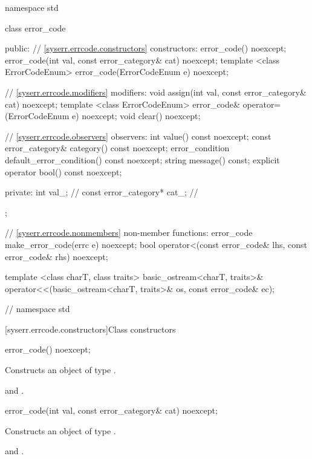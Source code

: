 %
\begin{codeblock}
namespace std {
  class error_code {
  public:
    // \ref{syserr.errcode.constructors} constructors:
    error_code() noexcept;
    error_code(int val, const error_category& cat) noexcept;
    template <class ErrorCodeEnum>
      error_code(ErrorCodeEnum e) noexcept;

    // \ref{syserr.errcode.modifiers} modifiers:
    void assign(int val, const error_category& cat) noexcept;
    template <class ErrorCodeEnum>
        error_code& operator=(ErrorCodeEnum e) noexcept;
    void clear() noexcept;

    // \ref{syserr.errcode.observers} observers:
    int value() const noexcept;
    const error_category& category() const noexcept;
    error_condition default_error_condition() const noexcept;
    string message() const;
    explicit operator bool() const noexcept;

  private:
    int val_;                   // \expos
    const error_category* cat_; // \expos
  };

  // \ref{syserr.errcode.nonmembers} non-member functions:
  error_code make_error_code(errc e) noexcept;
  bool operator<(const error_code& lhs, const error_code& rhs) noexcept;

  template <class charT, class traits>
    basic_ostream<charT, traits>&
      operator<<(basic_ostream<charT, traits>& os, const error_code& ec);
}   // namespace std
\end{codeblock}

[syserr.errcode.constructors]{Class  constructors}

%
\begin{itemdecl}
error_code() noexcept;
\end{itemdecl}

\begin{itemdescr}
\pnum
\effects Constructs an object of type .

\pnum
\postconditions {} and .
\end{itemdescr}

%
\begin{itemdecl}
error_code(int val, const error_category& cat) noexcept;
\end{itemdecl}

\begin{itemdescr}
\pnum
\effects Constructs an object of type .

\pnum
\postconditions {} and .
\end{itemdescr}

